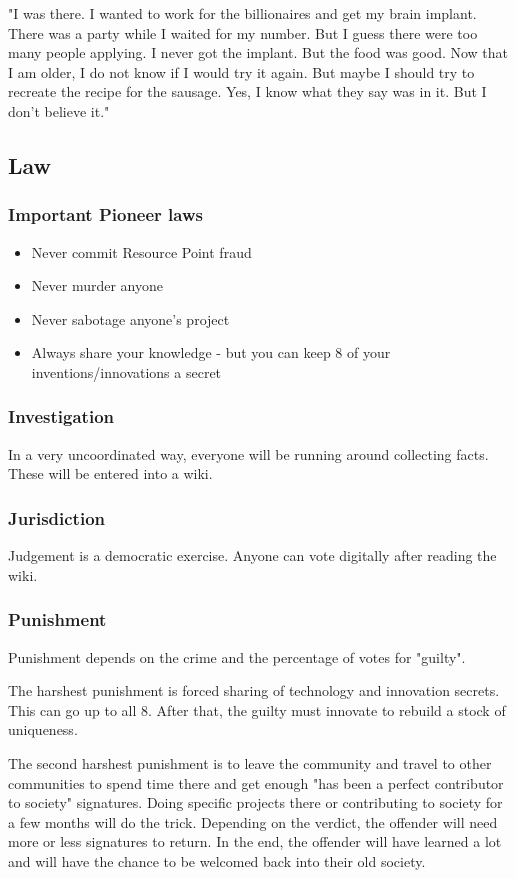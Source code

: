 "I was there. I wanted to work for the billionaires and get my brain implant. There was a party while I waited for my number. But I guess there were too many people applying. I never got the implant. But the food was good. Now that I am older, I do not know if I would try it again. But maybe I should try to recreate the recipe for the sausage. Yes, I know what they say was in it. But I don't believe it."

\subsection{Law}
\label{sec: pioneer law}

\subsubsection{Important Pioneer laws}

\begin{itemize}
\item{Never commit Resource Point fraud}
\item{Never murder anyone}
\item{Never sabotage anyone's project}
\item{Always share your knowledge - but you can keep 8 of your inventions/innovations a secret}   %
\end{itemize}

\subsubsection{Investigation}

In a very uncoordinated way, everyone will be running around collecting facts. These will be entered into a wiki.

\subsubsection{Jurisdiction}

Judgement is a democratic exercise. Anyone can vote digitally after reading the wiki.

\subsubsection{Punishment}

Punishment depends on the crime and the percentage of votes for "guilty".

The harshest punishment is forced sharing of technology and innovation secrets. This can go up to all 8. After that, the guilty must innovate to rebuild a stock of uniqueness.

The second harshest punishment is to leave the community and travel to other communities to spend time there and get enough "has been a perfect contributor to society" signatures. Doing specific projects there or contributing to society for a few months will do the trick. Depending on the verdict, the offender will need more or less signatures to return. In the end, the offender will have learned a lot and will have the chance to be welcomed back into their old society.


